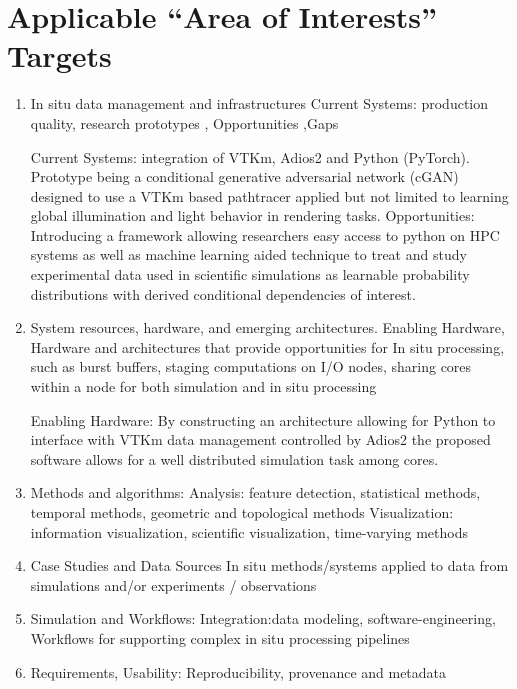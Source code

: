 \documentclass[sigconf,authordraft]{acmart}
\begin{document}
\section{Applicable ``Area of Interests'' Targets}
{\footnotesize
\begin{enumerate}
    \item In situ data management and infrastructures
Current Systems: production quality, research prototypes , Opportunities ,Gaps

Current Systems: integration of VTKm, Adios2 and Python (PyTorch). Prototype being a conditional generative adversarial network (cGAN) designed to use a VTKm based pathtracer applied but not limited to learning global illumination and light behavior in rendering tasks. 
Opportunities: Introducing a framework allowing researchers easy access to python on HPC systems as well as machine learning aided technique to treat and study experimental data used in scientific simulations as learnable probability distributions with derived conditional dependencies of interest.

   \item System resources, hardware, and emerging architectures.
Enabling Hardware, Hardware and architectures that provide opportunities for In situ processing, such as burst buffers, staging computations on I/O nodes, sharing cores within a node for both simulation and in situ processing

Enabling Hardware: By constructing an architecture allowing for Python to interface with VTKm data management controlled by Adios2 the proposed software allows for a well distributed simulation task among cores.

  \item Methods and algorithms:
Analysis: feature detection, statistical methods, temporal methods, geometric and topological methods 
Visualization: information visualization, scientific visualization, time-varying methods
  \item Case Studies and Data Sources
In situ methods/systems applied to data from simulations and/or experiments / observations
  \item Simulation and Workflows:
Integration:data modeling, software-engineering, 
Workflows for supporting complex in situ processing pipelines
  \item Requirements, Usability:
Reproducibility, provenance and metadata

\end{enumerate}
}
\end{document}
